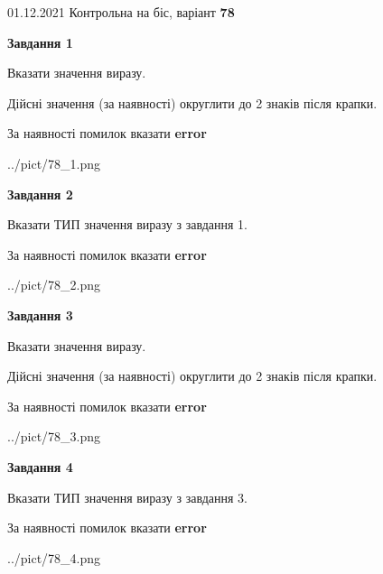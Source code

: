 \documentclass[11pt, ukrainian]{article}
\begin{document}
{01.12.2021 Контрольна на біс, варіант  \No \textbf { 78 }\par}
{
\begin {large}
{\begin {center}\textbf{Завдання 1}\end {center}}\par
Вказати значення виразу. \par
Дійсні значення (за наявності) округлити до 2 знаків після крапки. \par
За наявності помилок вказати \textbf{error}

\begin{center}
	{../pict/78_1.png}
\end{center}
\newpage

{\begin {center}\textbf{Завдання 2}\end {center}}\par
Вказати ТИП значення виразу з завдання 1. \par
За наявності помилок вказати \textbf{error}

\begin{center}
	{../pict/78_2.png}
\end{center}
\newpage

{\begin {center}\textbf{Завдання 3}\end {center}}\par
Вказати значення виразу. \par
Дійсні значення (за наявності) округлити до 2 знаків після крапки. \par
За наявності помилок вказати \textbf{error}

\begin{center}
	{../pict/78_3.png}
\end{center}
\newpage

{\begin {center}\textbf{Завдання 4}\end {center}}\par
Вказати ТИП значення виразу з завдання 3. \par
За наявності помилок вказати \textbf{error}

\begin{center}
	{../pict/78_4.png}
\end{center}
\newpage


\end{large}}
\end{document}

